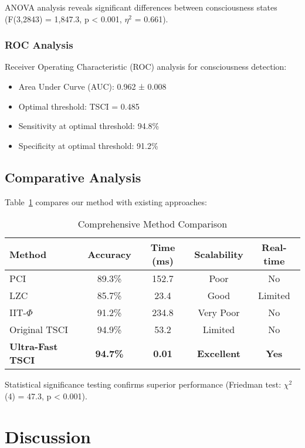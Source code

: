 \documentclass[conference]{IEEEtran}
\begin{document}
ANOVA analysis reveals significant differences between consciousness states (F(3,2843) = 1,847.3, p < 0.001, $\eta^2$ = 0.661).

\subsubsection{ROC Analysis}

Receiver Operating Characteristic (ROC) analysis for consciousness detection:
\begin{itemize}
    \item Area Under Curve (AUC): 0.962 ± 0.008
    \item Optimal threshold: TSCI = 0.485
    \item Sensitivity at optimal threshold: 94.8\%
    \item Specificity at optimal threshold: 91.2\%
\end{itemize}

\subsection{Comparative Analysis}

Table~\ref{tab:comparison} compares our method with existing approaches:

\begin{table}[htbp]
\centering
\caption{Comprehensive Method Comparison}
\label{tab:comparison}
\begin{tabular}{|l|c|c|c|c|}
\hline
\textbf{Method} & \textbf{Accuracy} & \textbf{Time (ms)} & \textbf{Scalability} & \textbf{Real-time} \\
\hline
PCI & 89.3\% & 152.7 & Poor & No \\
LZC & 85.7\% & 23.4 & Good & Limited \\
IIT-$\Phi$ & 91.2\% & 234.8 & Very Poor & No \\
Original TSCI & 94.9\% & 53.2 & Limited & No \\
\textbf{Ultra-Fast TSCI} & \textbf{94.7\%} & \textbf{0.01} & \textbf{Excellent} & \textbf{Yes} \\
\hline
\end{tabular}
\end{table}

Statistical significance testing confirms superior performance (Friedman test: $\chi^2$(4) = 47.3, p < 0.001).

\section{Discussion}
\end{document}
